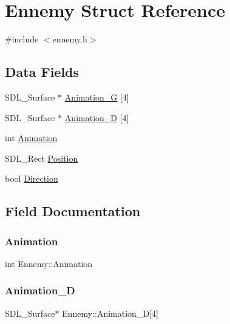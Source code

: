 \hypertarget{structEnnemy}{}\section{Ennemy Struct Reference}
\label{structEnnemy}


{\ttfamily \#include $<$ennemy.\+h$>$}

\subsection*{Data Fields}
\begin{DoxyCompactItemize}
\item 
S\+D\+L\+\_\+\+Surface $\ast$ \hyperlink{structEnnemy_a8b4bb002eeade326a908f36f46763490}{Animation\+\_\+G} \mbox{[}4\mbox{]}
\item 
S\+D\+L\+\_\+\+Surface $\ast$ \hyperlink{structEnnemy_a922bd100d0198e663b521dbc7a5289f9}{Animation\+\_\+D} \mbox{[}4\mbox{]}
\item 
int \hyperlink{structEnnemy_a15e3dcbde7c86ebdba79e7936e92dfe1}{Animation}
\item 
S\+D\+L\+\_\+\+Rect \hyperlink{structEnnemy_a37ae489643736f036ddae15bc86d00d0}{Position}
\item 
bool \hyperlink{structEnnemy_ae145eac6d968735d00d6b0426b3f14f4}{Direction}
\end{DoxyCompactItemize}


\subsection{Field Documentation}
\mbox{\label{structEnnemy_a15e3dcbde7c86ebdba79e7936e92dfe1}} 
\subsubsection{\texorpdfstring{Animation}{Animation}}
{\footnotesize\ttfamily int Ennemy\+::\+Animation}

\mbox{\label{structEnnemy_a922bd100d0198e663b521dbc7a5289f9}} 
\subsubsection{\texorpdfstring{Animation\+\_\+D}{Animation\_D}}
{\footnotesize\ttfamily S\+D\+L\+\_\+\+Surface$\ast$ Ennemy\+::\+Animation\+\_\+D\mbox{[}4\mbox{]}}

